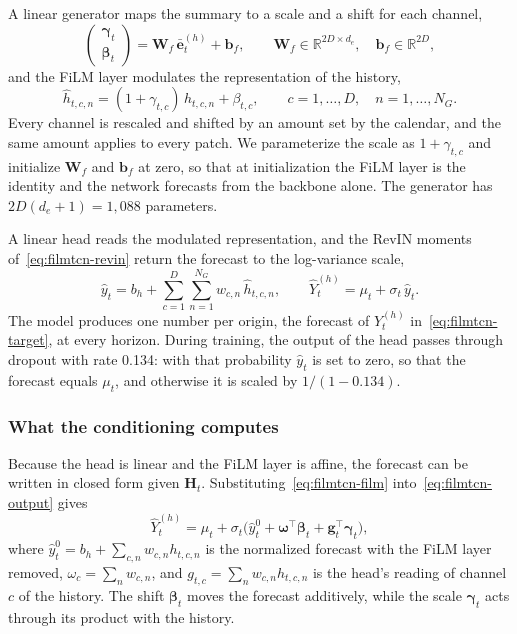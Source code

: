 A linear generator maps the summary to a scale and a shift for each channel,
\begin{equation}
  \begin{pmatrix}\boldsymbol{\gamma}_t\\ \boldsymbol{\beta}_t\end{pmatrix}
  = \mathbf{W}_f\,\bar{\mathbf{e}}^{(h)}_t + \mathbf{b}_f,
  \qquad
  \mathbf{W}_f \in \mathbb{R}^{2D\times d_e},\quad
  \mathbf{b}_f \in \mathbb{R}^{2D},
  \label{eq:filmtcn-generator}
\end{equation}
and the FiLM layer modulates the representation of the history,
\begin{equation}
  \hat{h}_{t,c,n} = (1+\gamma_{t,c})\,h_{t,c,n} + \beta_{t,c},
  \qquad c = 1,\dots,D,\quad n = 1,\dots,N_G.
  \label{eq:filmtcn-film}
\end{equation}
Every channel is rescaled and shifted by an amount set by the calendar, and the
same amount applies to every patch. We parameterize the scale as
$1+\gamma_{t,c}$ and initialize $\mathbf{W}_f$ and $\mathbf{b}_f$ at zero, so
that at initialization the FiLM layer is the identity and the network forecasts
from the backbone alone. The generator has $2D(d_e+1) = 1{,}088$ parameters.

A linear head reads the modulated representation, and the RevIN moments
of~\eqref{eq:filmtcn-revin} return the forecast to the log-variance scale,
\begin{equation}
  \hat{y}_t = b_h + \sum_{c=1}^{D}\sum_{n=1}^{N_G} w_{c,n}\,\hat{h}_{t,c,n},
  \qquad
  \hat{Y}^{(h)}_t = \mu_t + \sigma_t\,\hat{y}_t .
  \label{eq:filmtcn-output}
\end{equation}
The model produces one number per origin, the forecast of $Y^{(h)}_t$
in~\eqref{eq:filmtcn-target}, at every horizon. During training, the output of
the head passes through dropout with rate 0.134: with that probability
$\hat{y}_t$ is set to zero, so that the forecast equals $\mu_t$, and otherwise
it is scaled by $1/(1-0.134)$.

\subsubsection{What the conditioning computes}
\label{sec:filmtcn-decomposition}

Because the head is linear and the FiLM layer is affine, the forecast can be
written in closed form given $\mathbf{H}_t$. Substituting~\eqref{eq:filmtcn-film}
into~\eqref{eq:filmtcn-output} gives
\begin{equation}
  \hat{Y}^{(h)}_t
  = \mu_t + \sigma_t\bigl(\hat{y}^{0}_t
    + \boldsymbol{\omega}^\top\boldsymbol{\beta}_t
    + \mathbf{g}_t^\top\boldsymbol{\gamma}_t\bigr),
  \label{eq:filmtcn-decomp}
\end{equation}
where $\hat{y}^{0}_t = b_h + \sum_{c,n} w_{c,n}h_{t,c,n}$ is the normalized
forecast with the FiLM layer removed, $\omega_c = \sum_n w_{c,n}$, and
$g_{t,c} = \sum_n w_{c,n}h_{t,c,n}$ is the head's reading of channel $c$ of the
history. The shift $\boldsymbol{\beta}_t$ moves the forecast additively, while
the scale $\boldsymbol{\gamma}_t$ acts through its product with the history.

